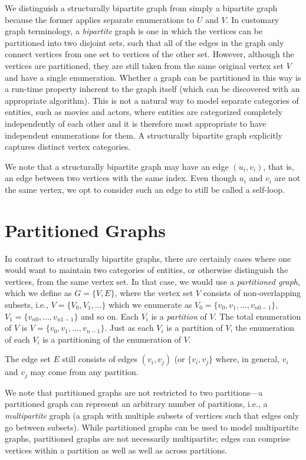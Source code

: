 We distinguish a structurally bipartite graph from simply a bipartite graph because the former applies separate enumerations to $U$ and $V$.  
In customary graph terminology, a \emph{bipartite} graph is one in which the vertices can be partitioned into two disjoint sets, such that all of the edges in the graph only connect vertices from one set to vertices of the other set.  However, although the vertices are partitioned, they are still taken from the same original vertex set $V$ and have a single enumeration.
Whether a graph can be partitioned in this way is a run-time property inherent to the graph itself (which can be discovered with an appropriate algorithm).  
This is not a natural way to model separate categories of entities, such as movies and actors, where entities are categorized completely independently of each other and it is therefore most appropriate to have independent enumerations for them.  
A structurally bipartite graph explicitly captures distinct vertex categories.
%

We note that a structurally bipartite graph may have an edge $(u_i, v_i)$, that is, an edge between two vertices with the same index.  Even though $u_i$ and $v_i$ are not the same vertex, we opt to consider such an edge to still be called a self-loop.


\section{Partitioned Graphs}

In contrast to structurally bipartite graphs, there are certainly cases
where one would want to maintain two categories of entities, or otherwise distinguish the vertices, from the same vertex set.  In that case, we would use a \emph{partitioned graph}, which we define as
$G = \{ V, E \}$, where the vertex set $V$ consists of non-overlapping subsets, i.e.,
$V = \{ V_0, V_1, \ldots \}$ which we enumerate as $V_0 = \{v_0, v_1, \ldots , v_{n0-1} \}$, 
$V_1 = \{ v_{n0}, \ldots , v_{n1-1} \}$ and so on.  Each $V_i$ is a \emph{partition} of $V$.
The total enumeration of $V$ is $V= \{ v_0, v_1, \ldots , v_{n-1} \}$.  Just as each $V_i$ is a partition of $V$, the enumeration of each $V_i$ is a partitioning of the enumeration of $V$.

The edge set $E$ still consists of edges $(v_i, v_j)$ (or $\{v_i, v_j\}$ where, in general, $v_i$ and $v_j$ may come from any partition.

We note that partitioned graphs are not restricted to two partitions---a partitioned graph can represent an arbitrary number of partitions, i.e., a \emph{multipartite} graph (a graph with multiple subsets of vertices such that edges only go between subsets).
While partitioned graphs can be used to model multipartite graphs, partitioned graphs are not necessarily multipartite; edges can comprise vertices within a partition as well as well as across partitions.



